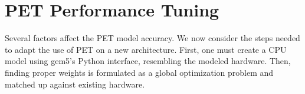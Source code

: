 \chapter{PET Performance Tuning}

Several factors affect the PET model accuracy. We now consider the steps needed
to adapt the use of PET on a new architecture. First, one must create a CPU
model using gem5's Python interface, resembling the modeled hardware. Then,
finding proper weights is formulated as a global optimization problem and
matched up against existing hardware.







